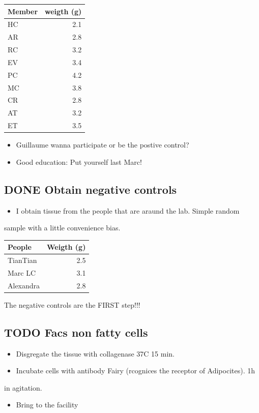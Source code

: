 \documentclass[11pt]{article}
\begin{document}
\begin{center}
\begin{tabular}{lr}
Member & weigth (g)\\
\hline
HC & 2.1\\
AR & 2.8\\
RC & 3.2\\
EV & 3.4\\
PC & 4.2\\
MC & 3.8\\
CR & 2.8\\
AT & 3.2\\
ET & 3.5\\
\end{tabular}
\end{center}



\begin{itemize}
\item Guillaume wanna participate or be the postive control?
\item Good education: Put yourself last Marc!
\end{itemize}
\subsection{{\bfseries\sffamily DONE} Obtain negative controls}
\label{sec:org2e71efc}
\begin{itemize}
\item I obtain tissue from the people that are araund the lab. Simple random
\end{itemize}
sample with a little convenience bias. 

\begin{center}
\begin{tabular}{lr}
People & Weigth (g)\\
\hline
TianTian & 2.5\\
Marc LC & 3.1\\
Alexandra & 2.8\\
\hline
\end{tabular}
\end{center}

The negative controls are the FIRST step!!! 
\subsection{{\bfseries\sffamily TODO} Facs non fatty cells}
\label{sec:org6c40db2}
\begin{itemize}
\item Disgregate the tissue with collagenase 37C 15 min.
\item Incubate cells with antibody Fairy (rcognices the receptor of Adipocites). 1h
\end{itemize}
in agitation.
\begin{itemize}
\item Bring to the facility
\end{itemize}
\end{document}
